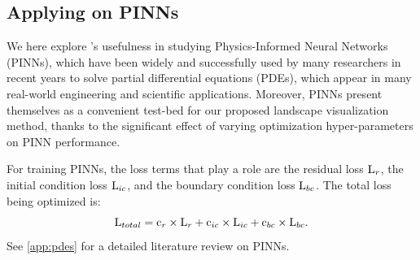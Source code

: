 \documentclass[letterpaper]{article} %
\begin{document}

                 
                
         
            
                




           \subsection{Applying \proposedautencoder{} on PINNs} 

            We here explore \proposedautencoder{}'s usefulness in studying Physics-Informed Neural Networks (PINNs), which have been widely and successfully used by many researchers in recent years to solve partial differential equations (PDEs), which appear in many real-world engineering and scientific applications. Moreover, PINNs present themselves as a convenient test-bed for our proposed landscape visualization method, thanks to 
            the significant effect of varying optimization hyper-parameters on PINN performance.

            For training PINNs, the loss terms that play a role  
            are the residual loss $\text{L}_{r}$, the initial condition loss $\text{L}_{ic}$, and the boundary condition loss $\text{L}_{bc}$. The total loss being optimized is:
            \begin{equation}
                \text{L}_{total} = \text{c}_{r} \times \text{L}_{r} + \text{c}_{ic} \times \text{L}_{ic} + \text{c}_{bc}\times  \text{L}_{bc}.
            \end{equation}
            See \cref{app:pdes} for a detailed literature review on PINNs.
\end{document}
